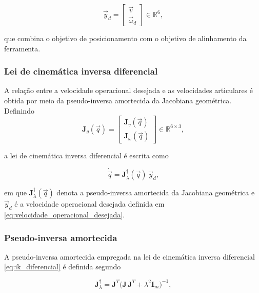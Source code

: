 \begin{equation}
\label{eq:velocidade_operacional_desejada}
\vec{y}_{d}
=
\begin{bmatrix}
\vec{v} \\
\vec{\omega}_{d}
\end{bmatrix}
\in \mathbb{R}^{6},
\end{equation}

que combina o objetivo de posicionamento com o objetivo de alinhamento da ferramenta.


\subsubsection{Lei de cinemática inversa diferencial}

A relação entre a velocidade operacional desejada e as velocidades articulares é obtida por meio da pseudo-inversa amortecida da Jacobiana geométrica. Definindo
\begin{equation}
\mathbf{J}_{g}(\vec q)
=
\begin{bmatrix}
\mathbf{J}_{v}(\vec q) \\
\mathbf{J}_{\omega}(\vec q)
\end{bmatrix}
\in \mathbb{R}^{6\times 3},
\end{equation}

a lei de cinemática inversa diferencial é escrita como

\begin{equation}
\label{eq:ik_diferencial}
\dot{\vec{q}}
=
\mathbf{J}_{\lambda}^{\dagger}(\vec q)\,\vec{y}_{d},
\end{equation}

em que $\mathbf{J}_{\lambda}^{\dagger}(\vec q)$ denota a pseudo-inversa amortecida da Jacobiana geométrica e $\vec{y}_{d}$ é a velocidade operacional desejada definida em \eqref{eq:velocidade_operacional_desejada}.


\subsubsection{Pseudo-inversa amortecida}

A pseudo-inversa amortecida empregada na lei de cinemática inversa diferencial \eqref{eq:ik_diferencial} é definida segundo \cite{sciavicco_siciliano2010} 

\begin{equation}
\label{eq:pseudoinversa_amortecida}
\mathbf{J}_{\lambda}^{\dagger}
=
\mathbf{J}^{T}
\bigl(
\mathbf{J}\,\mathbf{J}^{T}
+
\lambda^{2}\mathbf{I}_{m}
\bigr)^{-1},
\end{equation}


